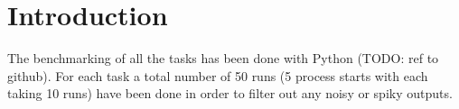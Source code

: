 \documentclass[final]{report}
\begin{document}
\chapter{Introduction}
The benchmarking of all the tasks has been done with Python (TODO: ref to github).
For each task a total number of 50 runs (5 process starts with each taking 10 runs) have been done in order to filter out any noisy or spiky outputs.

 
\end{document}
